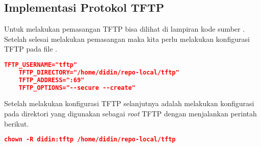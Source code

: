     	\subsection{Implementasi Protokol TFTP} 
    	Untuk melakukan pemasangan TFTP bisa dilihat di lampiran kode sumber .
    	Setelah selesai melakukan pemasangan maka kita perlu melakukan konfigurasi TFTP pada file .

	\begin{lstlisting}[frame=single,tabsize=2,breaklines,caption={Konfigurasi TFTP },label=nonrootuser, captionpos=b, language=json,numbers=none]
	TFTP_USERNAME="tftp"
	TFTP_DIRECTORY="/home/didin/repo-local/tftp"
	TFTP_ADDRESS=":69"
	TFTP_OPTIONS="--secure --create"
	\end{lstlisting}
        Setelah melakukan konfigurasi TFTP selanjutnya adalah melakukan konfigurasi pada direktori yang digunakan sebagai \textit{root} TFTP dengan menjalankan perintah berikut.
    \begin{lstlisting}[frame=single,tabsize=2,breaklines,caption={Konfigurasi direktori TFTP },label=nonrootuser, captionpos=b, language=json,numbers=none]
    chown -R didin:tftp /home/didin/repo-local/tftp
    \end{lstlisting}
    
